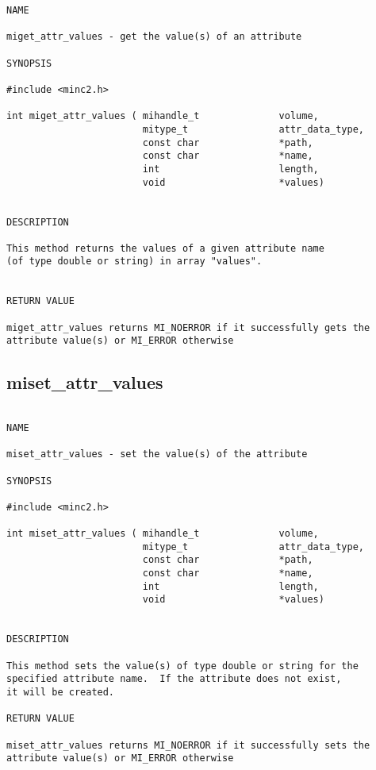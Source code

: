 \documentclass{article}
\begin{document}
\begin{verbatim}
NAME 

miget_attr_values - get the value(s) of an attribute

SYNOPSIS

#include <minc2.h>

int miget_attr_values ( mihandle_t              volume, 
                        mitype_t                attr_data_type,
                        const char              *path,
                        const char              *name,
                        int                     length,
                        void                    *values)

                                                
DESCRIPTION

This method returns the values of a given attribute name 
(of type double or string) in array "values".


RETURN VALUE

miget_attr_values returns MI_NOERROR if it successfully gets the
attribute value(s) or MI_ERROR otherwise
\end{verbatim}

\subsection{miset\_attr\_values}

\begin{verbatim}

NAME 

miset_attr_values - set the value(s) of the attribute

SYNOPSIS

#include <minc2.h>

int miset_attr_values ( mihandle_t              volume,
                        mitype_t                attr_data_type,
                        const char              *path,
                        const char              *name,
                        int                     length,
                        void                    *values)
                       
                                
DESCRIPTION

This method sets the value(s) of type double or string for the 
specified attribute name.  If the attribute does not exist, 
it will be created.

RETURN VALUE

miset_attr_values returns MI_NOERROR if it successfully sets the
attribute value(s) or MI_ERROR otherwise
\end{verbatim}
\end{document}
